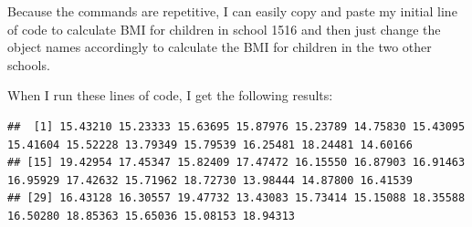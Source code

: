 \documentclass[
  12pt,
]{book}
\newenvironment{Shaded}{\begin{snugshade}}{\end{snugshade}}
\newcommand{\DecValTok}[1]{\textcolor[rgb]{0.00,0.00,0.81}{#1}}
\newcommand{\DocumentationTok}[1]{\textcolor[rgb]{0.56,0.35,0.01}{\textbf{\textit{#1}}}}
\newcommand{\NormalTok}[1]{#1}
\newcommand{\SpecialCharTok}[1]{\textcolor[rgb]{0.00,0.00,0.00}{#1}}
\begin{document}
\begin{Shaded}
\end{Shaded}

Because the commands are repetitive, I can easily copy and paste my initial line of code to calculate BMI for children in school 1516 and then just change the object names accordingly to calculate the BMI for children in the two other schools.

When I run these lines of code, I get the following results:

\begin{Shaded}
\end{Shaded}

\begin{verbatim}
##  [1] 15.43210 15.23333 15.63695 15.87976 15.23789 14.75830 15.43095 15.41604 15.52228 13.79349 15.79539 16.25481 18.24481 14.60166
## [15] 19.42954 17.45347 15.82409 17.47472 16.15550 16.87903 16.91463 16.95929 17.42632 15.71962 18.72730 13.98444 14.87800 16.41539
## [29] 16.43128 16.30557 19.47732 13.43083 15.73414 15.15088 18.35588 16.50280 18.85363 15.65036 15.08153 18.94313
\end{verbatim}
\end{document}
